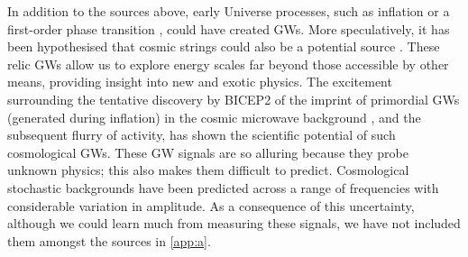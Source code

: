In addition to the sources above, early Universe processes, such as inflation \citep{Grishchuk2005} or a first-order phase transition \citep{Binetruy2012}, could have created GWs. More speculatively, it has been hypothesised that cosmic strings could also be a potential source \citep{Damour2005,Binetruy2012,Aasi2014}. These relic GWs allow us to explore energy scales far beyond those accessible by other means, providing insight into new and exotic physics. The excitement surrounding the tentative discovery by BICEP2 of the imprint of primordial GWs (generated during inflation) in the cosmic microwave background \citep{Ade2014}, and the subsequent flurry of activity, has shown the scientific potential of such cosmological GWs. These GW signals are so alluring because they probe unknown physics; this also makes them difficult to predict. Cosmological stochastic backgrounds have been predicted across a range of frequencies with considerable variation in amplitude. As a consequence of this uncertainty, although we could learn much from measuring these signals, we have not included them amongst the sources in \ref{app:a}.


